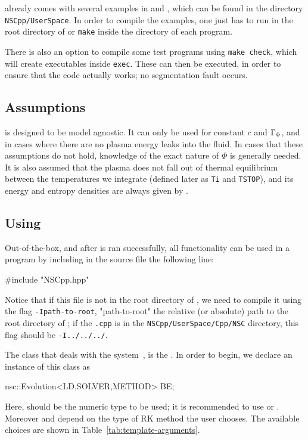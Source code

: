 \documentclass[11pt,a4paper]{article}
\begin{document}
\nsc already comes with several examples in \CPP and \PY, which can be found in the directory {\tt NSCpp/UserSpace}. In order to compile the \CPP examples, one just has to run  in the root directory of \nsc or {\tt make} inside the directory of each \CPP program.

There is also an option to compile some test programs using {\tt make check}, which will create executables inside {\tt exec}. These can then be executed, in order to ensure that the code actually works; \eg no segmentation fault occurs. 

\subsection{Assumptions}
%
\nsc is designed to be model agnostic. It can only be used for constant $c$ and $\Gamma_{\Phi}$, and in cases where there are no plasma energy leaks into the fluid. In cases that these assumptions do not hold, knowledge of the exact nature of $\Phi$ is generally needed.  It is also assumed that the plasma does not fall out of thermal equilibrium between the temperatures we integrate (defined later as {\tt Ti} and {\tt TSTOP}), and its energy and entropy densities are always given by .

\subsection{Using \nsc}\label{sec:Cpp_usage} 
%
Out-of-the-box, and after  is ran successfully, all \nsc functionality can be used in a \CPP program by including in the source file the following line:
%
\begin{cpp}
	#include "NSCpp.hpp"
\end{cpp}
%
Notice that if this file is not in the root directory of \nsc, we need to compile it using the flag {\tt -Ipath-to-root}, "path-to-root" the relative (or absolute) path to the root directory of \nsc; \eg if the {\tt .cpp} is in the {\tt NSCpp/UserSpace/Cpp/NSC} directory, this flag should be {\tt -I../../../}. 

 
The class that deals with the system~, is the . In order to begin, we declare an instance of this class as
%
\begin{cpp}
    nsc::Evolution<LD,SOLVER,METHOD> BE;
\end{cpp}
%
Here,  should be the numeric type to be used; it is recommended to use  or . Moreover  and  depend on the type of RK method the user chooses. The available choices are shown in Table~\ref{tab:template-arguments}. 
\end{document}
